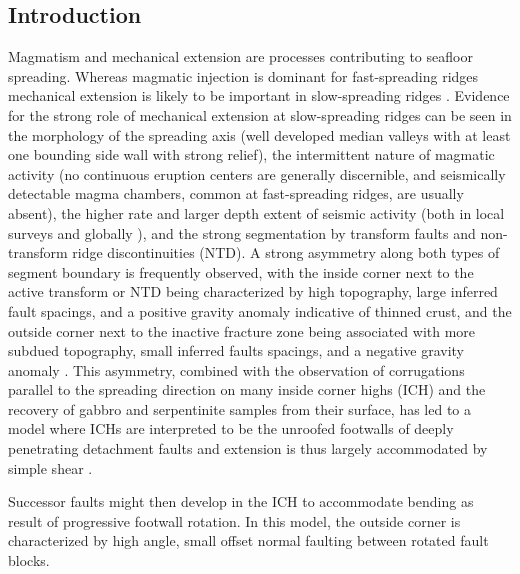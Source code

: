 \documentclass[jgrga]{agu2001} %
\newlength{\tw}
\providecommand{\DIFadd}[1]{{\protect\color{blue}\uwave{#1}}} %
\providecommand{\DIFaddbegin}{} %
\providecommand{\DIFaddend}{} %
\begin{document}
\begin{article}

\section{Introduction}

Magmatism and mechanical extension are 
 processes contributing to  seafloor spreading.  Whereas magmatic injection is dominant for
fast-spreading ridges mechanical extension is likely to be important
in slow-spreading ridges  \citep{mutter92}.  Evidence for the strong
role of mechanical extension at slow-spreading ridges can be seen in the morphology of the
spreading axis (well developed median valleys with at least one
bounding side wall with strong relief), the intermittent nature of
magmatic activity (no continuous eruption centers are generally 
discernible, and seismically detectable magma chambers, common at
fast-spreading ridges, are usually absent), the higher rate and larger
depth extent of seismic activity (both in local surveys
\citep[e.g.,][]{toomey88} and globally \citep{huang88,rundquist02}),
and the strong segmentation by transform faults and non-transform
ridge discontinuities (NTD). A strong asymmetry along both types of
segment boundary is frequently observed, with the inside corner next
to the active transform or NTD being
characterized  by high topography, large inferred fault spacings, and
a positive \DIFaddbegin \DIFadd{Mantle Bouguer }\DIFaddend gravity anomaly
indicative of thinned crust, and the outside corner next to the
inactive fracture zone being associated with more subdued topography,
small inferred faults spacings, 
and a negative gravity anomaly \citep{shaw93,escartin95}. This asymmetry,
combined with the observation of corrugations parallel to the
spreading direction on many inside corner highs (ICH) and the
recovery of gabbro and serpentinite samples from their surface, has
led to a model where ICHs are interpreted to be the unroofed footwalls
of  deeply penetrating detachment faults and  extension
is thus largely accommodated by simple shear
\citep{tucholke94}. 

 Successor faults might then
develop in the ICH to accommodate bending as result of progressive footwall rotation.  In this model, the outside
corner is characterized by high angle, small offset normal faulting
between rotated fault blocks. 


\end{article}
\end{document}
